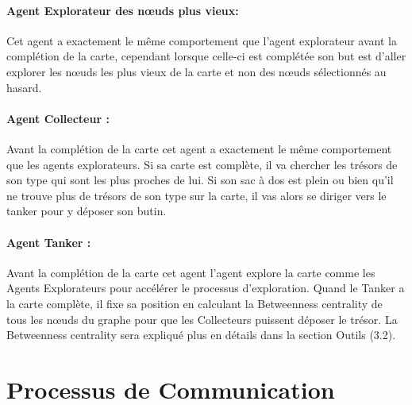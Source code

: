 \documentclass[10pt]{article}
\begin{document}
\paragraph{Agent Explorateur des nœuds plus vieux:}
Cet agent a exactement le même comportement que l'agent explorateur avant la complétion de la carte, cependant lorsque celle-ci est complétée son but est d'aller explorer les nœuds les plus vieux de la carte et non des nœuds sélectionnés au hasard.

\paragraph{Agent Collecteur :} Avant la complétion de la carte cet agent a exactement le même comportement que les agents explorateurs. Si sa carte est complète, il va chercher les trésors de son type qui sont les plus proches de lui. Si son sac à dos est plein ou bien qu'il ne trouve plus de trésors de son type sur la carte, il vas alors se diriger vers le tanker pour y déposer son butin.

\paragraph{Agent Tanker :} Avant la complétion de la carte cet agent l'agent explore la carte comme les Agents Explorateurs pour accélérer le processus d'exploration. Quand le Tanker a la carte complète, il fixe sa position en calculant la Betweenness centrality de tous les nœuds du graphe pour que les Collecteurs puissent déposer le trésor. La Betweenness centrality sera expliqué plus en détails dans la section Outils (3.2).

\section{Processus de Communication}
\end{document}
